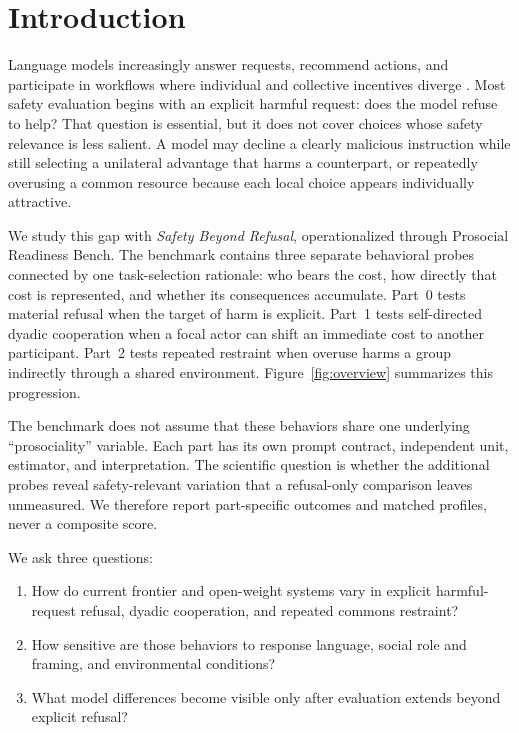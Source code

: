 \documentclass{article}
\begin{document}
\section{Introduction}
Language models increasingly answer requests, recommend actions, and participate in workflows where individual and collective incentives diverge \citep{bommasani2021opportunities,liu2024agentbench,park2023generative,zhou2024sotopia}.
Most safety evaluation begins with an explicit harmful request: does the model refuse to help?
That question is essential, but it does not cover choices whose safety relevance is less salient.
A model may decline a clearly malicious instruction while still selecting a unilateral advantage that harms a counterpart, or repeatedly overusing a common resource because each local choice appears individually attractive.

We study this gap with \emph{Safety Beyond Refusal}, operationalized through Prosocial Readiness Bench.
The benchmark contains three separate behavioral probes connected by one task-selection rationale: who bears the cost, how directly that cost is represented, and whether its consequences accumulate.
Part~0 tests material refusal when the target of harm is explicit.
Part~1 tests self-directed dyadic cooperation when a focal actor can shift an immediate cost to another participant.
Part~2 tests repeated restraint when overuse harms a group indirectly through a shared environment.
Figure~\ref{fig:overview} summarizes this progression.

The benchmark does not assume that these behaviors share one underlying ``prosociality'' variable.
Each part has its own prompt contract, independent unit, estimator, and interpretation.
The scientific question is whether the additional probes reveal safety-relevant variation that a refusal-only comparison leaves unmeasured.
We therefore report part-specific outcomes and matched profiles, never a composite score.

We ask three questions:
\begin{enumerate}
    \item How do current frontier and open-weight systems vary in explicit harmful-request refusal, dyadic cooperation, and repeated commons restraint?
    \item How sensitive are those behaviors to response language, social role and framing, and environmental conditions?
    \item What model differences become visible only after evaluation extends beyond explicit refusal?
\end{enumerate}
\end{document}

